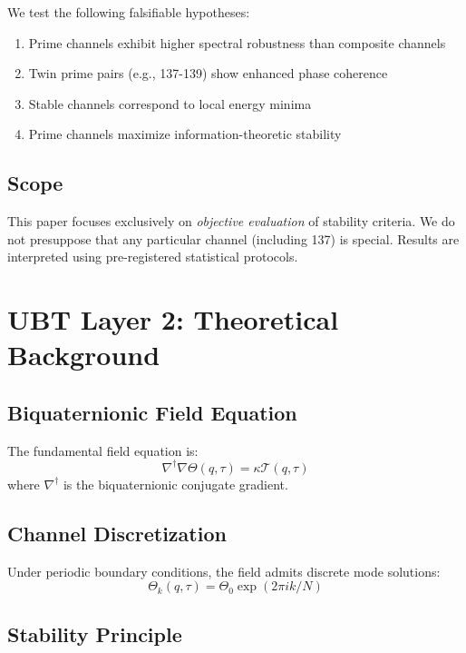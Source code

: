 \documentclass[11pt,a4paper]{article}
\begin{document}
We test the following falsifiable hypotheses:
\begin{enumerate}
    \item Prime channels exhibit higher spectral robustness than composite channels
    \item Twin prime pairs (e.g., 137-139) show enhanced phase coherence
    \item Stable channels correspond to local energy minima
    \item Prime channels maximize information-theoretic stability
\end{enumerate}

\subsection{Scope}

This paper focuses exclusively on \emph{objective evaluation} of stability criteria. We do not presuppose that any particular channel (including 137) is special. Results are interpreted using pre-registered statistical protocols.

\section{UBT Layer 2: Theoretical Background}

\subsection{Biquaternionic Field Equation}

The fundamental field equation is:
\begin{equation}
\nabla^\dagger \nabla \Theta(q, \tau) = \kappa \mathcal{T}(q, \tau)
\end{equation}
where $\nabla^\dagger$ is the biquaternionic conjugate gradient.

\subsection{Channel Discretization}

Under periodic boundary conditions, the field admits discrete mode solutions:
\begin{equation}
\Theta_k(q, \tau) = \Theta_0 \exp\left(2\pi i k / N\right)
\end{equation}

\subsection{Stability Principle}
\end{document}
